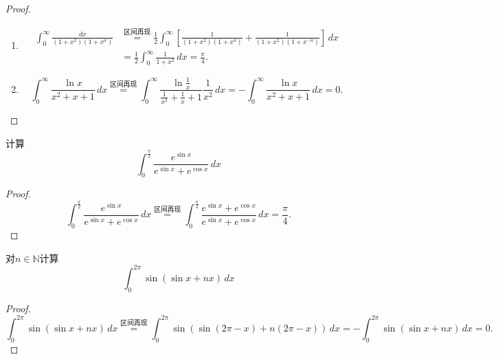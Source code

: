 \documentclass[lang=cn,10pt,thmcnt=section]{elegantbook}
\begin{document}
\begin{proof}
	\begin{enumerate}

		\item
		\begin{align*}
			\int_{0}^{\infty} \frac{dx}{(1+x^2)(1+x^a)}
			&\overset{\text{区间再现}}{=} \frac{1}{2} \int_{0}^{\infty} \left[ \frac{1}{(1+x^2)(1+x^a)} + \frac{1}{(1+x^2)(1+x^{-a})} \right] \, dx \\
			&= \frac{1}{2} \int_{0}^{\infty} \frac{1}{1+x^2} \, dx = \frac{\pi}{4}.
		\end{align*}
		\item 
		\[
			\int_{0}^{\infty} \frac{\ln x}{x^2+x+1} \, dx 
			\overset{\text{区间再现}}{=} \int_{0}^{\infty} \frac{\ln\frac{1}{x}}{\frac{1}{x^2}+\frac{1}{x}+1} \frac{1}{x^2} \, dx 
			= -\int_{0}^{\infty} \frac{\ln x}{x^2+x+1} \, dx = 0.
		\]
	
	\end{enumerate}
\end{proof}
\begin{example}
	计算
	\[\int_{0}^{\frac{\pi}{2}}\frac{e^{\sin x}}{e^{\sin x}+e^{\cos x}}  \,dx 
	\]
\end{example}
\begin{proof}
	\[
    \int_{0}^{\frac{\pi}{2}} \frac{e^{\sin x}}{e^{\sin x} + e^{\cos x}} \, dx 
    \overset{\text{区间再现}}{=} \int_{0}^{\frac{\pi}{4}} \frac{e^{\sin x} + e^{\cos x}}{e^{\sin x} + e^{\cos x}} \, dx = \frac{\pi}{4}.
\]
\end{proof}
\begin{example}
	对$n\in\mathbb{N} $计算
	\[\int_{0}^{2\pi}  \sin(\sin x+nx )\,dx 
	\]
\end{example}
\begin{proof}
	\[
    \int_{0}^{2\pi} \sin(\sin x + nx) \, dx 
    \overset{\text{区间再现}}{=} \int_{0}^{2\pi} \sin(\sin(2\pi - x) + n(2\pi - x)) \, dx 
    = -\int_{0}^{2\pi} \sin(\sin x + nx) \, dx = 0.
\]
\end{proof}
\end{document}
